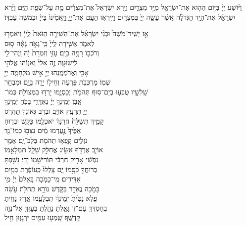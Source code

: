 וַיּ֨וֹשַׁע
יְיָ֜ בַּיּ֥וֹם הַה֛וּא אֶת־יִשְׂרָאֵ֖ל מִיַּ֣ד מִצְרָ֑יִם וַיַּ֤רְא יִשְׂרָאֵל֙ אֶת־מִצְרַ֔יִם מֵ֖ת עַל־שְׂפַ֥ת הַיָּֽם׃
וַיַּ֨רְא יִשְׂרָאֵ֜ל אֶת־הַיָּ֣ד הַגְּדֹלָ֗ה אֲשֶׁ֨ר עָשָׂ֤ה יְיָ֙ בְּמִצְרַ֔יִם וַיִּֽירְא֥וּ הָעָ֖ם אֶת־יְיָ֑ וַיַּֽאֲמִ֙ינוּ֙ בַּייָ֔ וּבְמֹשֶׁ֖ה עַבְדּֽוֹ׃

אָ֣ז \hfill
יָשִֽׁיר־מֹשֶׁה֩ \hfill וּבְנֵ֨י \hfill יִשְׂרָאֵ֜ל \hfill אֶת־הַשִּׁירָ֤ה \hfill הַזֹּאת֙ \hfill לַֽייָ֔ \hfill וַיֹּאמְר֖וּ \\
לֵאמֹ֑ר \hfill אָשִׁ֤ירָה לַֽייָ֙ כִּֽי־גָאֹ֣ה גָּאָ֔ה \hfill ס֥וּס \\
וְרֹכְב֖וֹ רָמָ֥ה בַיָּֽם׃ \hfill עׇזִּ֤י וְזִמְרָת֙ יָ֔הּ וַֽיְהִי־לִ֖י \\
לִֽישׁוּעָ֑ה \hfill זֶ֤ה אֵלִי֙ וְאַנְוֵ֔הוּ \hfill אֱלֹהֵ֥י \\
אָבִ֖י וַאֲרֹמְמֶֽנְהוּ׃ \hfill יְיָ֖ אִ֣ישׁ מִלְחָמָ֑ה יְיָ֖ \\
שְׁמֽוֹ׃ \hfill מַרְכְּבֹ֥ת פַּרְעֹ֛ה וְחֵיל֖וֹ יָרָ֣ה בַיָּ֑ם \hfill וּמִבְחַ֥ר\\
שָֽׁלִשָׁ֖יו טֻבְּע֥וּ בְיַם־סֽוּף׃ \hfill תְּהֹמֹ֖ת יְכַסְיֻ֑מוּ יָרְד֥וּ בִמְצוֹלֹ֖ת כְּמוֹ־\\
אָֽבֶן׃ \hfill יְמִֽינְךָ֣ יְיָ֔ נֶאְדָּרִ֖י בַּכֹּ֑חַ \hfill יְמִֽינְךָ֥ \\
יְיָ֖ תִּרְעַ֥ץ אוֹיֵֽב׃ \hfill וּבְרֹ֥ב גְּאוֹנְךָ֖ תַּהֲרֹ֣ס \\
קָמֶ֑יךָ \hfill תְּשַׁלַּח֙ חֲרֹ֣נְךָ֔ יֹאכְלֵ֖מוֹ כַּקַּֽשׁ׃ \hfill וּבְר֤וּחַ \\
אַפֶּ֙יךָ֙ נֶ֣עֶרְמוּ מַ֔יִם \hfill נִצְּב֥וּ כְמוֹ־נֵ֖ד \\
נֹזְלִ֑ים \hfill קָֽפְא֥וּ תְהֹמֹ֖ת בְּלֶב־יָֽם׃ \hfill אָמַ֥ר \\
אוֹיֵ֛ב אֶרְדֹּ֥ף אַשִּׂ֖יג \hfill אֲחַלֵּ֣ק שָׁלָ֑ל תִּמְלָאֵ֣מוֹ \\
נַפְשִׁ֔י \hfill אָרִ֣יק חַרְבִּ֔י תּוֹרִישֵׁ֖מוֹ יָדִֽי׃ \hfill נָשַׁ֥פְתָּ \\
בְרוּחֲךָ֖ כִּסָּ֣מוֹ יָ֑ם \hfill צָֽלְלוּ֙ כַּֽעוֹפֶ֔רֶת בְּמַ֖יִם \\
אַדִּירִֽים׃ \hfill מִֽי־כָמֹ֤כָה בָּֽאֵלִם֙ יְיָ֔ \hfill מִ֥י \\
כָּמֹ֖כָה נֶאְדָּ֣ר בַּקֹּ֑דֶשׁ \hfill נוֹרָ֥א תְהִלֹּ֖ת עֹ֥שֵׂה \\
פֶֽלֶא׃ \hfill נָטִ֙יתָ֙ יְמִ֣ינְךָ֔ תִּבְלָעֵ֖מוֹ אָֽרֶץ׃ \hfill נָחִ֥יתָ \\
בְחַסְדְּךָ֖ עַם־ז֣וּ גָּאָ֑לְתָּ \hfill נֵהַ֥לְתָּ בְעׇזְּךָ֖ אֶל־נְוֵ֥ה \\
קׇדְשֶֽׁךָ׃ \hfill שָֽׁמְע֥וּ עַמִּ֖ים יִרְגָּז֑וּן \hfill חִ֣יל \\
